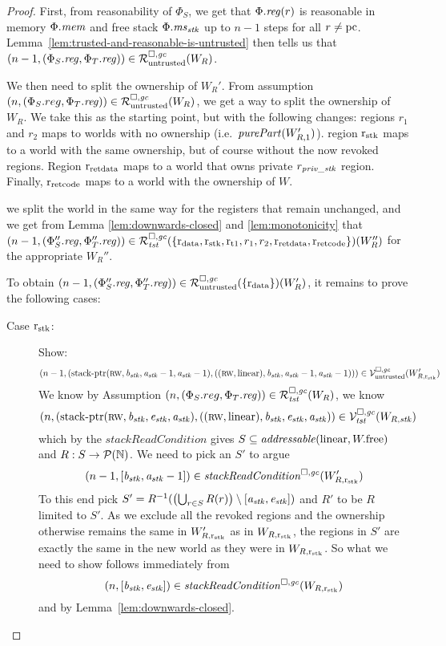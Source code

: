 \begin{proof}
  First, from reasonability of $\Phi_S$, we get that $\Phi.\reg(r)$ is reasonable in memory $\Phi.\mem$ and free stack $\Phi.\ms_\stk$ up to $n-1$ steps for all $r \neq \pcreg$.
  Lemma~\ref{lem:trusted-and-reasonable-is-untrusted} then tells us that
  $\npair[n-1]{(\Phi_S.\reg,\Phi_T.\reg)} \in \lrr(W_R)$.

  We then need to split the ownership of $W_R'$.
  From assumption $\npair[n]{(\Phi_S.reg,\Phi_T.\reg)} \in \lrr(W_R)$, we get a way to split the ownership of $W_R$.
  We take this as the starting point, but with the following changes: regions $r_1$ and $r_2$ maps to worlds with no ownership (i.e.\ $\purePart{W_{R,1}'}$).
  region $\rstk$ maps to a world with the same ownership, but of course without the now revoked regions.
  Region $\rretd$ maps to a world that owns private $r_\var{priv\_stk}$ region.
  Finally, $\rretc$ maps to a world with the ownership of $W$.

  we split the world in the same way for the registers that remain unchanged, and we get from Lemma \ref{lem:downwards-closed} and \ref{lem:monotonicity} that
  $\npair[n-1]{(\Phi_S''.\reg,\Phi_T''.\reg)} \in \lrrg{\trust}(\{\rdata,\rstk,\rtmp{1},r_1,r_2,\rretd,\rretc\})(W_R'')$ for the appropriate $W_R''$.

  To obtain $\npair[n-1]{(\Phi_S''.\reg,\Phi_T''.\reg)} \in \lrr(\{\rdata\})(W_R')$, it remains to prove the following cases:
  \begin{description}
  \item[Case $\rstk$:] Show:
    \[
      \npair[n-1]{(\stkptr{\rw,\baddr_\stk,\aaddr_\stk-1,\aaddr_\stk-1},((\rw,\linear),\baddr_\stk,\aaddr_\stk-1,\aaddr_\stk-1))} \in \lrv(W_{R,\rstk}')
    \]
    We know by Assumption $\npair[n]{(\Phi_S.reg,\Phi_T.\reg)} \in \lrrg{\trust}(W_R)$, we know
    \[
      \npair[n]{(\stkptr{\rw,\baddr_\stk,\eaddr_\stk,\aaddr_\stk},((\rw, \linear), \baddr_\stk ,\eaddr_\stk, \aaddr_\stk)} \in \lrvg{\trust}(W_{R,\stk})
    \]
    which by the $\mathit{stackReadCondition}$ gives $S \subseteq \addressable{\linear,\pwfree}$ and $R : S \fun \powerset{\nats}$.
    We need to pick an $S'$ to argue
    \[
      \npair[n-1]{[\baddr_\stk,\aaddr_\stk-1]} \in \stackReadCond{W_{R,\rstk}'}
    \]
    To this end pick $S' = R^{-1}(\left(\bigcup_{r\in S} R(r) \right) \setminus [\aaddr_\stk,\eaddr_\stk])$ and $R'$ to be $R$ limited to $S'$.
    As we exclude all the revoked regions and the ownership otherwise remains the
    same in $W_{R,\rstk}'$ as in $W_{R,\rstk}$, the regions in $S'$ are exactly the same in the new world as they were in $W_{R,\rstk}$.
    So what we need to show follows immediately from
    \[
      \npair[n]{[\baddr_\stk,\eaddr_\stk]} \in \stackReadCond{W_{R,\rstk}}
    \]
    and by Lemma~\ref{lem:downwards-closed}.


\end{description}
\end{proof}
